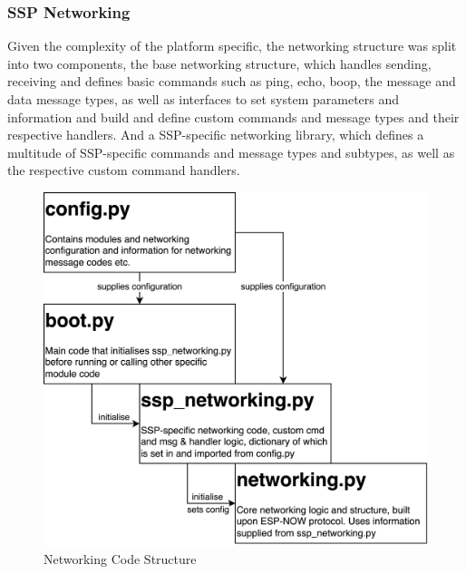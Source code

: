 \subsubsection{\label{sec:methods_ssp_networking}SSP Networking}

Given the complexity of the platform specific, the networking structure was split into two components, the base networking structure, which handles sending, receiving and defines basic commands such as ping, echo, boop, the message and data message types, as well as interfaces to set system parameters and information and build and define custom commands and message types and their respective handlers. And a SSP-specific networking library, which defines a multitude of SSP-specific commands and message types and subtypes, as well as the respective custom command handlers. 

\begin{figure}[H]
    \centering
    \includegraphics[width=.6\linewidth]{overleaf/images/code_structure.png}
    \vspace{\ftspace}
    \caption{Networking Code Structure}
    \label{fig:net_code_structure}
\end{figure}

